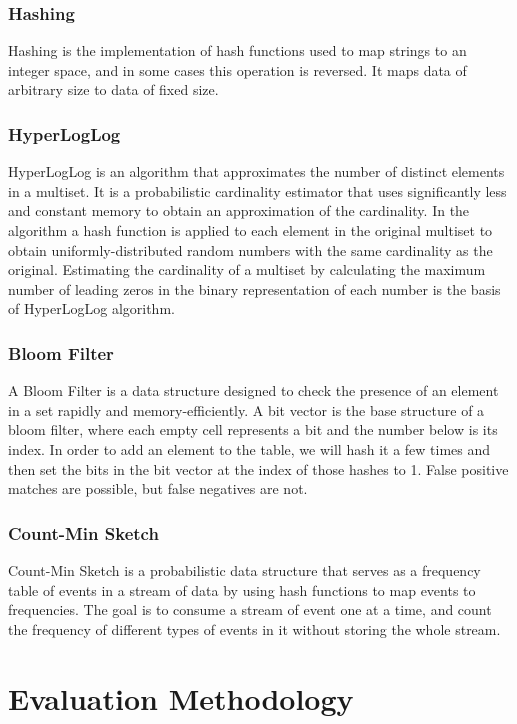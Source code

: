 \documentclass[preprint,nocopyrightspace]{sig-alternate}
\begin{document}
\subsubsection{Hashing}
Hashing is the implementation of hash functions used to map strings to an integer space,
and in some cases this operation is reversed.
It maps data of arbitrary size to data of fixed size.

\subsubsection{HyperLogLog}
HyperLogLog is an algorithm that approximates the number of distinct elements in a multiset.
It is a probabilistic cardinality estimator that uses significantly less and constant memory to obtain an approximation of the cardinality.
In the algorithm a hash function is applied to each element in the original multiset to obtain uniformly-distributed random numbers with the same cardinality as the original.
Estimating the cardinality of a multiset by calculating the maximum number of leading zeros in the binary representation of each number is the basis of HyperLogLog algorithm.

\subsubsection{Bloom Filter}
A Bloom Filter is a data structure designed to check the presence of an element in a set rapidly and memory-efficiently.
A bit vector is the base structure of a bloom filter,
where each empty cell represents a bit and the number below is its index.
In order to add an element to the table,
we will hash it a few times and then set the bits in the bit vector at the index of those hashes to 1.
False positive matches are possible,
but false negatives are not.

\subsubsection{Count-Min Sketch}
Count-Min Sketch is a probabilistic data structure that serves as a frequency table of events in a stream of data by using hash functions to map events to frequencies.
The goal is to consume a stream of event one at a time,
and count the frequency of different types of events in it without storing the whole stream.

\section{Evaluation Methodology}
\end{document}
